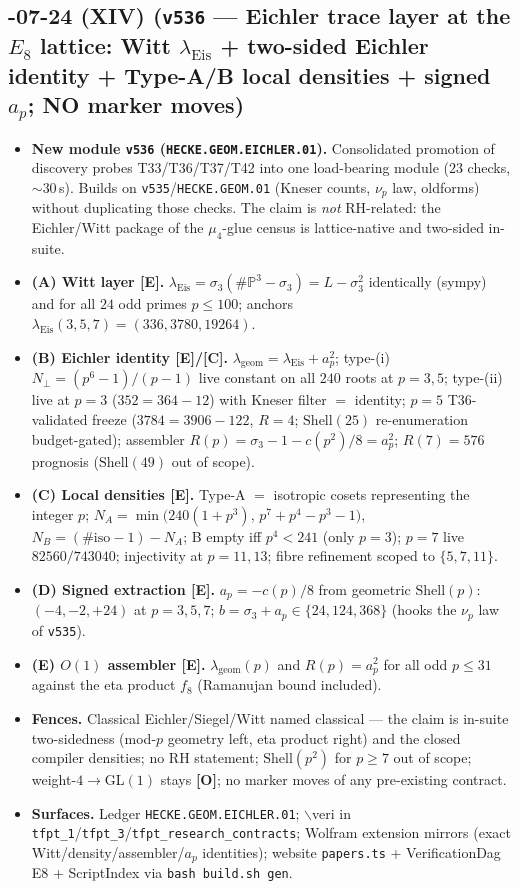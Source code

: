 \documentclass[11pt]{article}
\providecommand{\mE}{\textbf{[E]}}\providecommand{\mC}{\textbf{[C]}}
\providecommand{\mO}{\textbf{[O]}}\providecommand{\mX}{\textbf{[X]}}
\begin{document}
\subsection*{-07-24 (XIV) (\texttt{v536} --- Eichler trace layer at the $E_8$ lattice: Witt $\lambda_{\mathrm{Eis}}$ + two-sided Eichler identity + Type-A/B local densities + signed $a_p$; NO marker moves)}
\begin{itemize}[leftmargin=1.5em]
\item \textbf{New module \texttt{v536} (\texttt{HECKE.GEOM.EICHLER.01}).} Consolidated promotion of discovery
probes T33/T36/T37/T42 into one load-bearing module ($23$ checks, $\sim30$\,s). Builds on
\texttt{v535}/\texttt{HECKE.GEOM.01} (Kneser counts, $\nu_p$ law, oldforms) without duplicating those
checks. The claim is \emph{not} RH-related: the Eichler/Witt package of the $\mu_4$-glue census is
lattice-native and two-sided in-suite.
\item \textbf{(A) Witt layer \mE.} $\lambda_{\mathrm{Eis}}=\sigma_3(\#\mathbb P^3-\sigma_3)=L-\sigma_3^2$
identically (sympy) and for all $24$ odd primes $p\le100$; anchors
$\lambda_{\mathrm{Eis}}(3,5,7)=(336,3780,19264)$.
\item \textbf{(B) Eichler identity \mE/\mC.} $\lambda_{\mathrm{geom}}=\lambda_{\mathrm{Eis}}+a_p^2$;
type-(i) $N_\perp=(p^6-1)/(p-1)$ live constant on all $240$ roots at $p=3,5$; type-(ii) live at
$p=3$ ($352=364-12$) with Kneser filter $=$ identity; $p=5$ T36-validated freeze
($3784=3906-122$, $R=4$; $\mathrm{Shell}(25)$ re-enumeration budget-gated); assembler
$R(p)=\sigma_3-1-c(p^2)/8=a_p^2$; $R(7)=576$ prognosis ($\mathrm{Shell}(49)$ out of scope).
\item \textbf{(C) Local densities \mE.} Type-A $=$ isotropic cosets representing the integer $p$;
$N_A=\min\bigl(240(1+p^3),\,p^7+p^4-p^3-1\bigr)$, $N_B=(\#\mathrm{iso}-1)-N_A$; B empty iff
$p^4<241$ (only $p=3$); $p=7$ live $82560/743040$; injectivity at $p=11,13$; fibre refinement
scoped to $\{5,7,11\}$.
\item \textbf{(D) Signed extraction \mE.} $a_p=-c(p)/8$ from geometric $\mathrm{Shell}(p)$:
$(-4,-2,+24)$ at $p=3,5,7$; $b=\sigma_3+a_p\in\{24,124,368\}$ (hooks the $\nu_p$ law of
\texttt{v535}).
\item \textbf{(E) $O(1)$ assembler \mE.} $\lambda_{\mathrm{geom}}(p)$ and $R(p)=a_p^2$ for all odd
$p\le31$ against the eta product $f_8$ (Ramanujan bound included).
\item \textbf{Fences.} Classical Eichler/Siegel/Witt named classical --- the claim is in-suite
two-sidedness (mod-$p$ geometry left, eta product right) and the closed compiler densities; no RH
statement; $\mathrm{Shell}(p^2)$ for $p\ge7$ out of scope; weight-$4\to$GL$(1)$ stays \mO; no
marker moves of any pre-existing contract.
\item \textbf{Surfaces.} Ledger \texttt{HECKE.GEOM.EICHLER.01}; $\backslash$veri in
\texttt{tfpt\_1}/\texttt{tfpt\_3}/\texttt{tfpt\_research\_contracts}; Wolfram extension mirrors
(exact Witt/density/assembler/$a_p$ identities); website \texttt{papers.ts} + VerificationDag E8 +
ScriptIndex via \texttt{bash build.sh gen}.
\end{itemize}
\end{document}
